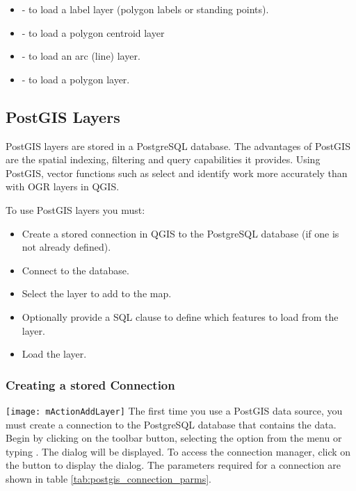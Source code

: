 \begin{itemize}
\item {} - to load a label layer (polygon labels or standing points).
\item {} - to load a polygon centroid layer 
\item {} - to load an arc (line) layer.
\item {} - to load a polygon layer.
\end{itemize}

\subsection{PostGIS Layers}
\label{label_postgis} 

PostGIS layers are stored in a PostgreSQL database. The advantages of PostGIS
are the spatial indexing, filtering and query capabilities it provides. Using PostGIS,
vector functions such as select and identify work more accurately than with
OGR layers in QGIS.

To use PostGIS layers you must:

\begin{itemize}
\item Create a stored connection in QGIS to the PostgreSQL database (if one is
not already defined).
\item Connect to the database.
\item Select the layer to add to the map.
\item Optionally provide a SQL 
clause to define which features
to load from the layer.
\item Load the layer.
\end{itemize}

\subsubsection{Creating a stored
Connection}\label{sec:postgis_stored}

\texttt{[image: mActionAddLayer]} The first time
you use a PostGIS data source, you must create a connection to the PostgreSQL
database that contains the data. Begin by clicking on the
 toolbar button, selecting the
 option from the  menu or typing
. 
The  dialog will
be displayed. To access the connection manager, click on the  button to display the  dialog. The parameters required for a connection are shown
in table \ref{tab:postgis_connection_parms}.

